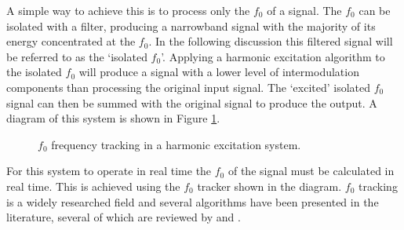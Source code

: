 		A simple way to achieve this is to process only the $f_{0}$ of a signal. The $f_{0}$ can be isolated with a
		filter, producing a narrowband signal with the majority of its energy concentrated at the $f_{0}$. In the
		following discussion this filtered signal will be referred to as the `isolated $f_{0}$'.  Applying a
		harmonic excitation algorithm to the isolated $f_{0}$ will produce a signal with a lower level of
		intermodulation components than processing the original input signal. The `excited' isolated $f_{0}$ signal
		can then be summed with the original signal to produce the output. A diagram of this system is shown in
		Figure \ref{fig:F0Tracking}.

		\begin{figure}[h!]
			\centering
			\caption{$f_{0}$ frequency tracking in a harmonic excitation system.}
			\label{fig:F0Tracking}
		\end{figure}

		For this system to operate in real time the $f_{0}$ of the signal must be calculated in real time. This is
		achieved using the $f_{0}$ tracker shown in the diagram. $f_{0}$ tracking is a widely researched field and
		several algorithms have been presented in the literature, several of which are reviewed by
		\citet{cuadra2001efficient} and \citet{gerhard2003pitch}.

